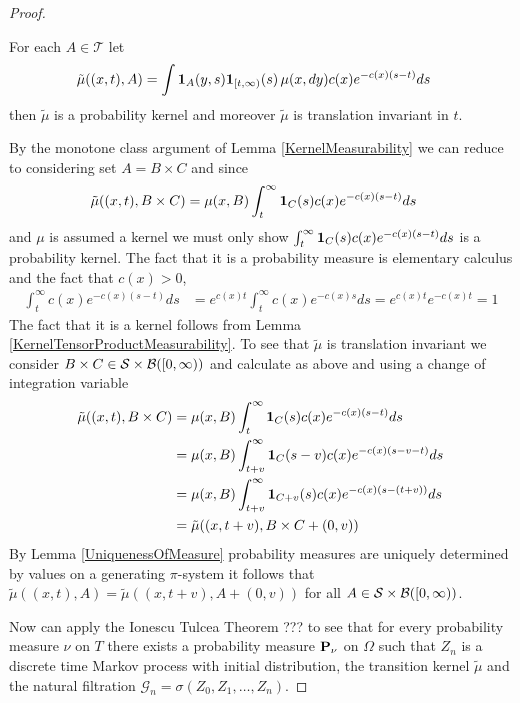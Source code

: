 \begin{proof}
\begin{clm} For each $A \in \mathcal{T}$ let 
\begin{align*}
\tilde{\mu}((x,t), A) &=
\int \textbf{1}_{A}(y,s) \textbf{1}_{[t,\infty)}(s) \, \mu(x, dy) c(x) e^{-c(x)(s-t)} ds
\end{align*}
then $\tilde{\mu}$ is a probability kernel and moreover $\tilde{\mu}$ is translation invariant in $t$.
\end{clm}
By the monotone class argument of Lemma \ref{KernelMeasurability} we can reduce to considering
set $A = B \times C$ and since 
\begin{align*}
\tilde{\mu}((x,t), B \times C) &= \mu(x, B) \int_t^\infty \textbf{1}_{C}(s) c(x) e^{-c(x)(s-t)} ds
\end{align*}
and $\mu$ is assumed a kernel we must only show $\int_t^\infty \textbf{1}_{C}(s) c(x) e^{-c(x)(s-t)} ds$
is a probability kernel.  The fact that it is a probability measure is elementary calculus and the fact that $c(x) > 0$,
\begin{align*}
\int_t^\infty c(x) e^{-c(x)(s-t)} ds &= e^{c(x)t} \int_t^\infty c(x) e^{-c(x)s} ds = e^{c(x)t} e^{-c(x)t} =1
\end{align*}
The fact that it is a kernel follows from Lemma \ref{KernelTensorProductMeasurability}.  To see that $\tilde{\mu}$ is translation invariant we consider
$B \times C \in \mathcal{S} \times \mathcal{B}([0,\infty))$ and calculate as above and using a change of integration variable 
\begin{align*}
\tilde{\mu}((x,t), B \times C) &= \mu(x, B) \int_t^\infty \textbf{1}_{C}(s) c(x) e^{-c(x)(s-t)} ds \\
&= \mu(x, B) \int_{t+v}^\infty \textbf{1}_{C}(s-v) c(x) e^{-c(x)(s - v -t)} ds \\
&= \mu(x, B) \int_{t+v}^\infty \textbf{1}_{C+v}(s) c(x) e^{-c(x)(s - (t+v))} ds \\
&= \tilde{\mu}((x,t+v), B \times C+(0,v))
\end{align*}
By Lemma \ref{UniquenessOfMeasure} probability measures are uniquely determined by values on a generating $\pi$-system it follows that 
$\tilde{\mu}((x,t), A) = \tilde{\mu}((x,t+v), A+(0,v))$ for all $A \in \mathcal{S} \times \mathcal{B}([0,\infty))$.

Now can apply the Ionescu Tulcea Theorem ??? to see that for every probability measure $\nu$ on $T$ there
exists a probability measure $\textbf{P}_\nu$ on $\Omega$ such that $Z_n$ is a discrete time Markov process
with initial distribution, the transition kernel $\tilde{\mu}$ and the natural filtration $\mathcal{G}_n = \sigma(Z_0, Z_1, \dotsc, Z_n)$.


\end{proof}
